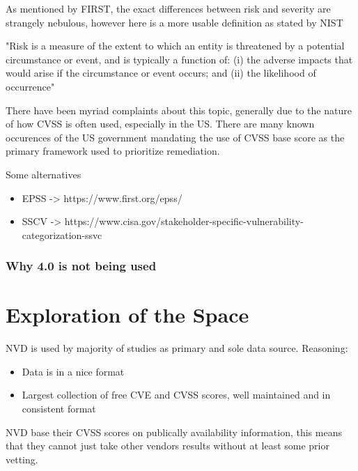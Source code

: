 \documentclass[11pt]{article}
\begin{document}
As mentioned by FIRST, the exact differences between risk and severity are strangely nebulous,
however here is a more usable definition as stated by NIST

"Risk is a measure of the extent to which an entity is threatened by a potential circumstance or event, and is
typically a function of: (i) the adverse impacts that would arise if the circumstance or event occurs; and (ii) the
likelihood of occurrence"

There have been myriad complaints about this topic, generally due to the nature of how CVSS is often
used, especially in the US. There are many known occurences of the US government mandating the use
of CVSS base score as the primary framework used to prioritize remediation.





Some alternatives
\begin{itemize}
	\item EPSS -> https://www.first.org/epss/
	\item SSCV -> https://www.cisa.gov/stakeholder-specific-vulnerability-categorization-ssvc
\end{itemize}

\subsubsection{Why 4.0 is not being used}
\section{Exploration of the Space}

NVD is used by majority of studies as primary and sole data source.
Reasoning:
\begin{itemize}
	\item Data is in a nice format
	\item Largest collection of free CVE and CVSS scores, well maintained and in consistent format
\end{itemize}

NVD base their CVSS scores on publically availability information, this means that they cannot
just take other vendors results without at least some prior vetting.
\end{document}
